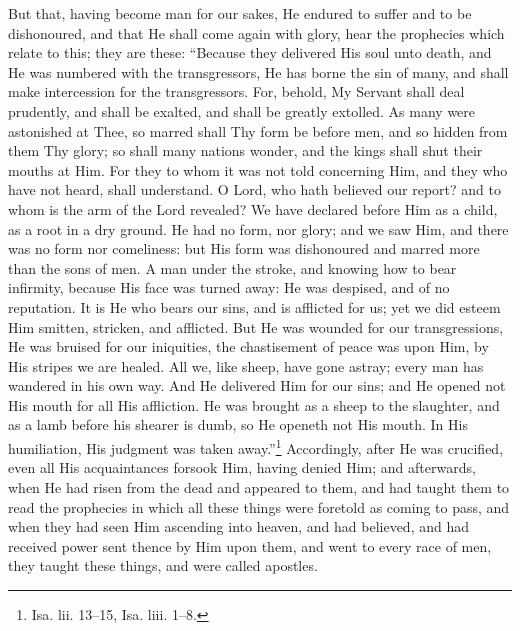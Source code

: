 But that, having become man for our sakes, He endured to suffer and to be dishonoured, and that He shall come again with glory, hear the prophecies which relate to this; they are these: “Because they delivered His soul unto death, and He was numbered with the transgressors, He has borne the sin of many, and shall make intercession for the transgressors. For, behold, My Servant shall deal prudently, and shall be exalted, and shall be greatly extolled. As many were astonished at Thee, so marred shall Thy form be before men, and so hidden from them Thy glory; so shall many nations wonder, and the kings shall shut their mouths at Him. For they to whom it was not told concerning Him, and they who have not heard, shall understand. O Lord, who hath believed our report? and to whom is the arm of the Lord revealed? We have declared before Him as a child, as a root in a dry ground. He had no form, nor glory; and we saw Him, and there was no form nor comeliness: but His form was dishonoured and marred more than the sons of men. A man under the stroke, and knowing how to bear infirmity, because His face was turned away: He was despised, and of no reputation. It is He who bears our sins, and is afflicted for us; yet we did esteem Him smitten, stricken, and afflicted. But He was wounded for our transgressions, He was bruised for our iniquities, the chastisement of peace was upon Him, by His stripes we are healed. All we, like sheep, have gone astray; every man has wandered in his own way. And He delivered Him for our sins; and He opened not His mouth for all His affliction. He was brought as a sheep to the slaughter, and as a lamb before his shearer is dumb, so He openeth not His mouth. In His humiliation, His judgment was taken away.”\footnote{Isa. lii. 13–15, Isa. liii. 1–8.} Accordingly, after He was crucified, even all His acquaintances forsook Him, having denied Him; and afterwards, when He had risen from the dead and appeared to them, and had taught them to read the prophecies in which all these things were foretold as coming to pass, and when they had seen Him ascending into heaven, and had believed, and had received power sent thence by Him upon them, and went to every race of men, they taught these things, and were called apostles.


